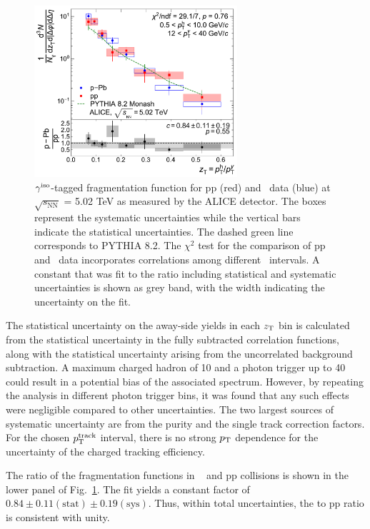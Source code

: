 \begin{figure}
    \centering
    \includegraphics[width=0.67\textwidth]{Data_Analysis/gammahadron/Final_FFunction_and_Ratio.pdf}
    \caption{$\gamma^\mathrm{iso}$-tagged fragmentation function for pp (red) and \pPb~data (blue) at $\sqrt{s_\mathrm{NN}}$ = 5.02 TeV as measured by the ALICE detector. The boxes represent the systematic uncertainties while the vertical bars indicate the statistical uncertainties. The dashed green line corresponds to \textsc{PYTHIA 8.2}. The $\chi^2$ test for the comparison of pp and \pPb~data incorporates correlations among different \zt~intervals. A constant that was fit to the ratio including statistical and systematic uncertainties is shown as grey band, with the width indicating the uncertainty on the fit.}
    \label{fig:Fragmentation_Functions}
\end{figure}

The statistical uncertainty on the away-side yields in each $z_{\mathrm{T}}$ bin is calculated from the statistical uncertainty in the fully subtracted correlation functions, along with the statistical uncertainty arising from the uncorrelated background subtraction. A maximum charged hadron \pt of 10 \GeVc and a photon trigger \pt up to 40 \GeVc could result in a potential bias of the associated \zt spectrum. However, by repeating the analysis in different photon trigger \pt bins, it was found that any such effects were negligible compared to other uncertainties. The two largest sources of systematic uncertainty are from the purity and the single track correction factors. For the chosen $p_{\mathrm{T}}^{\mathrm{track}}$ interval, there is no strong $p_{\mathrm{T}}$ dependence for the uncertainty of the charged tracking efficiency.

 The ratio of the fragmentation functions in \pPb~ and pp collisions is shown in the lower panel of Fig.~\ref{fig:Fragmentation_Functions}.
The fit yields a constant factor of $0.84\pm0.11\mathrm{(stat)}\pm0.19\mathrm{(sys)}$. %
 Thus, within total uncertainties,
 the \pPb to pp ratio is consistent with unity. %



